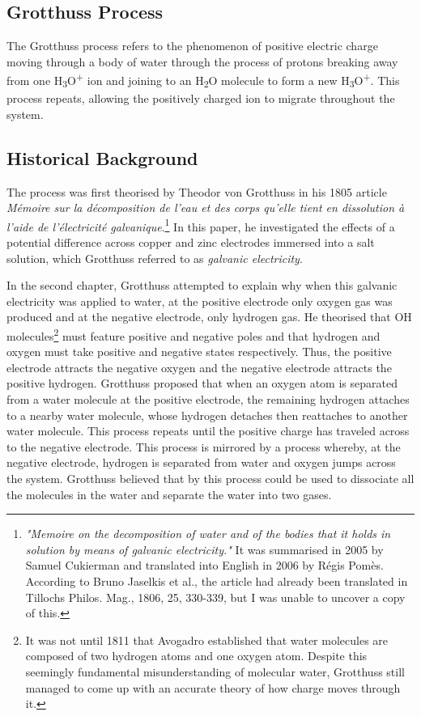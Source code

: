 \documentclass{article}
\begin{document}
\begin{multicols}{2}
\section{Grotthuss Process}

The Grotthuss process refers to the phenomenon of positive electric charge moving through a body of water through the process of protons breaking away from one H\textsubscript{3}O\textsuperscript{+} ion and joining to an H\textsubscript{2}O molecule to form a new H\textsubscript{3}O\textsuperscript{+}. This process repeats, allowing the positively charged ion to migrate throughout the system.

\subsection{Historical Background}
The process was first theorised by Theodor von Grotthuss in his 1805 article \textit{M{\'e}moire sur la d{\'e}composition de l'eau et des corps qu'elle tient en dissolution {\`a} l'aide de l'{\'e}lectricit{\'e} galvanique}.\cite{Grotthuss1805}\footnote{\textit{"Memoire on the decomposition of water and of the bodies that it holds in solution by means of galvanic electricity."} It was summarised in 2005 by Samuel Cukierman \cite{Cukiermann2005} and translated into English in 2006 by R\'egis Pom\`es.\cite{Grotthuss2006} According to Bruno Jaselkis et al.,\cite{Jaselskis2007} the article had already been translated in Tillochs Philos. Mag., 1806, 25, 330-339, but I was unable to uncover a copy of this.} In this paper, he investigated the effects of a potential difference across copper and zinc electrodes immersed into a salt solution, which Grotthuss referred to as \textit{galvanic electricity}.

In the second chapter, Grotthuss attempted to explain why when this galvanic electricity was applied to water, at the positive electrode only oxygen gas was produced and at the negative electrode, only hydrogen gas. He theorised that OH molecules\footnote{It was not until 1811 that Avogadro established that water molecules are composed of two hydrogen atoms and one oxygen atom.\cite{Avogadro1811} Despite this seemingly fundamental misunderstanding of molecular water, Grotthuss still managed to come up with an accurate theory of how charge moves through it.} must feature positive and negative poles and that hydrogen and oxygen must take positive and negative states respectively. Thus, the positive electrode attracts the negative oxygen and the negative electrode attracts the positive hydrogen. Grotthuss proposed that when an oxygen atom is separated from a water molecule at the positive electrode, the remaining hydrogen attaches to a nearby water molecule, whose hydrogen detaches then reattaches to another water molecule. This process repeats until the positive charge has traveled across to the negative electrode. This process is mirrored by a process whereby, at the negative electrode, hydrogen is separated from water and oxygen jumps across the system. Grotthuss believed that by this process could be used to dissociate all the molecules in the water and separate the water into two gases.\cite{Jaselskis2007}


\end{multicols}
\end{document}
